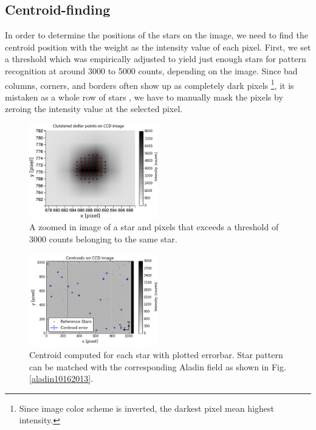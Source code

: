 \documentclass[authoryear, 12pt,5p, times]{elsarticle}
\begin{document}
\subsection{Centroid-finding}
\label{centroid_find}
In order to determine the positions of the stars on the image, we need to find the centroid position with the weight as the intensity value of each pixel. First, we set a threshold which was empirically adjusted to yield just enough stars for pattern recognition at around 3000 to 5000 counts, depending on the image. 
Since bad columns, corners, and borders often show up as completely dark pixels \footnote{Since image color scheme is inverted, the darkest pixel mean highest intensity.}, it is mistaken as a whole row of stars , we have to manually mask the pixels by zeroing the intensity value at the selected pixel.
	\begin{figure}[h!]
\includegraphics[width=0.5\textwidth]{figures/centroid_many}
\caption{A zoomed in image of a star and pixels that exceeds a threshold of 3000 counts belonging to the same star.}
\label{centroid_many}
\end{figure}
    	\begin{figure}[h!]
\includegraphics[width=0.5\textwidth]{figures/centroid_error_image}
\caption{Centroid computed for each star with plotted errorbar. Star pattern can be matched with the corresponding Aladin field as shown in Fig. \ref{aladin10162013}.}
\label{centroid_error_image}
\end{figure}
\end{document}
